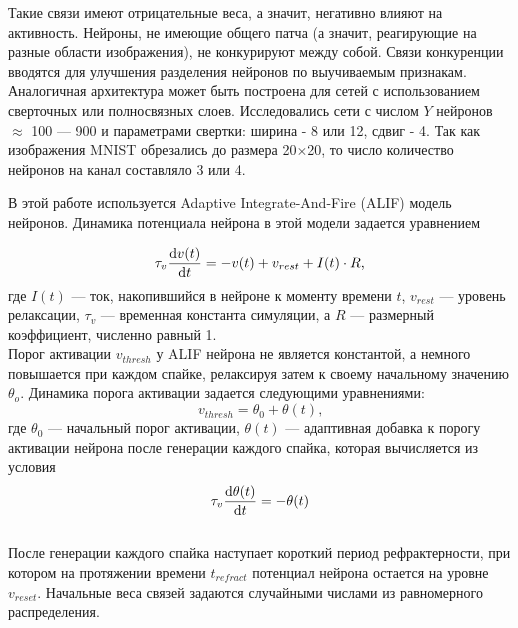 \documentclass[a4paper]{article}
\begin{document}
Такие связи имеют отрицательные веса, а значит, негативно влияют на активность. Нейроны, не имеющие общего патча (а значит, реагирующие на разные области изображения), не конкурируют между собой. Связи конкуренции вводятся для улучшения разделения нейронов по выучиваемым признакам. Аналогичная архитектура может быть построена для сетей с использованием сверточных или полносвязных слоев. Исследовались сети с числом $Y$ нейронов $\approx$ 100 --- 900 и параметрами свертки: ширина - 8 или 12, сдвиг - 4. Так как изображения MNIST обрезались до размера 20$\times$20, то число количество нейронов на канал составляло 3 или 4.

В этой работе используется Adaptive Integrate-And-Fire (ALIF) модель нейронов. Динамика потенциала нейрона в этой модели задается уравнением

\begin{equation} \label{eq:alif}
 \tau_v \dv{v(t)}{t} = -v(t) + v_{rest} + I(t) \cdot R \text{,}
\end{equation} где $I(t)$ --- ток, накопившийся в нейроне к моменту времени $t$, $v_{rest}$ --- уровень релаксации, $\tau_v$ --- временная константа симуляции, а $R$ --- размерный коэффициент, численно равный 1.\\ 

Порог активации $v_{thresh}$ у ALIF нейрона не является константой, а немного повышается при каждом спайке, релаксируя затем к своему начальному значению $\theta_o$. Динамика порога активации задается следующими уравнениями:
\begin{equation} 
 v_{thresh} = \theta_0 + \theta(t) \text{,}
\end{equation} где $\theta_0$ --- начальный порог активации, $\theta(t)$ --- адаптивная добавка к порогу активации нейрона после генерации каждого спайка, которая вычисляется из условия\\

\begin{equation}
 \tau_v \dv{\theta(t)}{t} = -\theta(t)
\end{equation}\\

После генерации каждого спайка наступает короткий период рефрактерности, при котором на протяжении времени $t_{refract}$ потенциал нейрона остается на уровне $v_{reset}$. Начальные веса связей задаются случайными числами из равномерного распределения.
\end{document}
